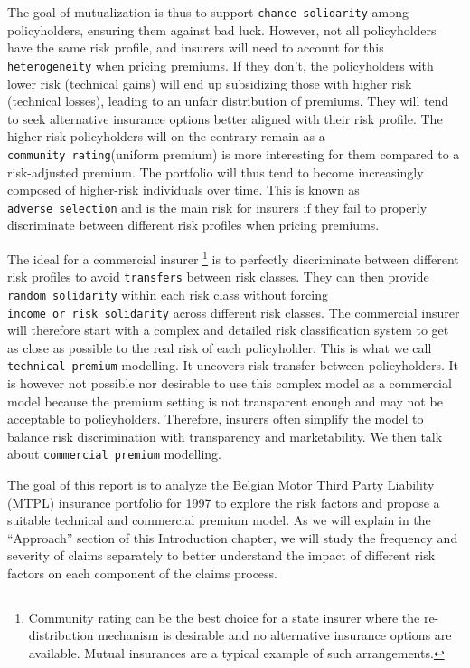 \documentclass[
  english,
  11pt,
]{article}
\begin{document}
The goal of mutualization is thus to support \texttt{chance\ solidarity}
among policyholders, ensuring them against bad luck. However, not all
policyholders have the same risk profile, and insurers will need to
account for this \texttt{heterogeneity} when pricing premiums. If they
don't, the policyholders with lower risk (technical gains) will end up
subsidizing those with higher risk (technical losses), leading to an
unfair distribution of premiums. They will tend to seek alternative
insurance options better aligned with their risk profile. The
higher-risk policyholders will on the contrary remain as a
\texttt{community\ rating}(uniform premium) is more interesting for them
compared to a risk-adjusted premium. The portfolio will thus tend to
become increasingly composed of higher-risk individuals over time. This
is known as \texttt{adverse\ selection} and is the main risk for
insurers if they fail to properly discriminate between different risk
profiles when pricing premiums.

The ideal for a commercial insurer \footnote{Community rating can be the
  best choice for a state insurer where the re-distribution mechanism is
  desirable and no alternative insurance options are available. Mutual
  insurances are a typical example of such arrangements.} is to
perfectly discriminate between different risk profiles to avoid
\texttt{transfers} between risk classes. They can then provide
\texttt{random\ solidarity} within each risk class without forcing
\texttt{income\ or\ risk\ solidarity} across different risk classes. The
commercial insurer will therefore start with a complex and detailed risk
classification system to get as close as possible to the real risk of
each policyholder. This is what we call \texttt{technical\ premium}
modelling. It uncovers risk transfer between policyholders. It is
however not possible nor desirable to use this complex model as a
commercial model because the premium setting is not transparent enough
and may not be acceptable to policyholders. Therefore, insurers often
simplify the model to balance risk discrimination with transparency and
marketability. We then talk about \texttt{commercial\ premium}
modelling.

The goal of this report is to analyze the Belgian Motor Third Party
Liability (MTPL) insurance portfolio for 1997 to explore the risk
factors and propose a suitable technical and commercial premium model.
As we will explain in the ``Approach'' section of this Introduction
chapter, we will study the frequency and severity of claims separately
to better understand the impact of different risk factors on each
component of the claims process.
\end{document}
